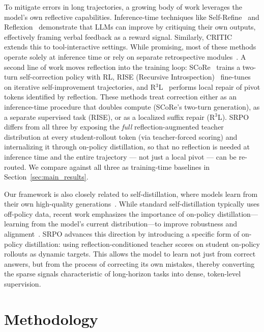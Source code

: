 \documentclass{article}
\newcommand{\method}{SRPO}
\theoremstyle{plain}
\theoremstyle{definition}
\theoremstyle{remark}
\begin{document}
To mitigate errors in long trajectories, a growing body of work leverages the model's own reflective capabilities. Inference-time techniques like Self-Refine~\cite{madaan2023selfrefine} and Reflexion~\cite{shinn2023reflexion} demonstrate that LLMs can improve by critiquing their own outputs, effectively framing verbal feedback as a reward signal. Similarly, CRITIC~\cite{gou2024critic} extends this to tool-interactive settings. While promising, most of these methods operate solely at inference time or rely on separate retrospective modules~\cite{yao2024retroformer}. A second line of work moves reflection into the training loop: SCoRe~\cite{SCoRe} trains a two-turn self-correction policy with RL, RISE (Recursive Introspection)~\cite{qu2024rise} fine-tunes on iterative self-improvement trajectories, and R$^3$L~\cite{r3l2026} performs local repair of pivot tokens identified by reflection. These methods treat correction either as an inference-time procedure that doubles compute (SCoRe's two-turn generation), as a separate supervised task (RISE), or as a localized suffix repair (R$^3$L). \method{} differs from all three by exposing the \emph{full} reflection-augmented teacher distribution at every student-rollout token (via teacher-forced scoring) and internalizing it through on-policy distillation, so that no reflection is needed at inference time and the entire trajectory --- not just a local pivot --- can be re-routed. We compare against all three as training-time baselines in Section~\ref{sec:main_results}.

Our framework is also closely related to self-distillation, where models learn from their own high-quality generations~\cite{pham2022revisitingselfdistillation,yang-etal-2024-self}. While standard self-distillation typically uses off-policy data, recent work emphasizes the importance of on-policy distillation—learning from the model's current distribution—to improve robustness and alignment~\cite{agarwal2024onpolicy,unlocking_on_policy_distillation_for_any_model_family}. SRPO advances this direction by introducing a specific form of on-policy distillation: using reflection-conditioned teacher scores on student on-policy rollouts as dynamic targets. This allows the model to learn not just from correct answers, but from the process of correcting its own mistakes, thereby converting the sparse signals characteristic of long-horizon tasks into dense, token-level supervision.
\section{Methodology}
\label{methodology}
\end{document}

